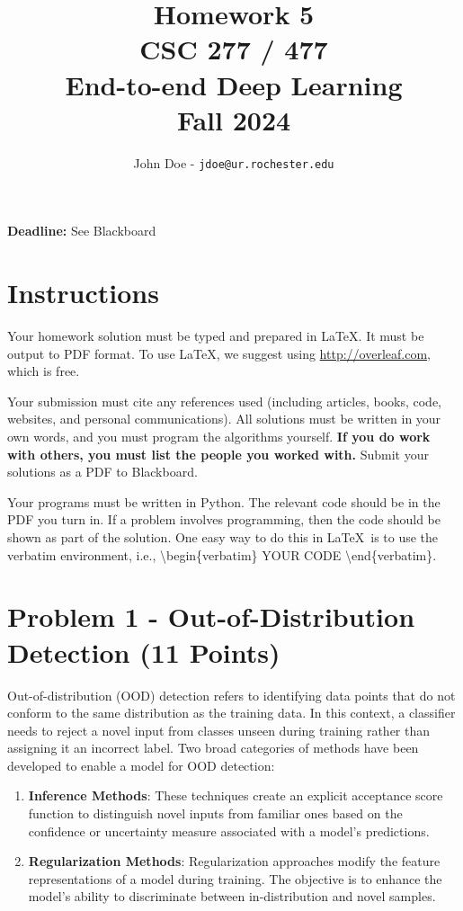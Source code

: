 \documentclass[11pt, oneside]{article}   	%
\title{Homework 5 \\ CSC 277 / 477 \\ End-to-end Deep Learning \\ Fall 2024}
\author{John Doe - \texttt{jdoe@ur.rochester.edu}}
\date{}
\begin{document}
\maketitle

\begin{center}
    \textbf{Deadline:} See Blackboard    
\end{center}


\section*{Instructions}

Your homework solution must be typed and prepared in \LaTeX. It must be output to PDF format. To use \LaTeX, we suggest using \url{http://overleaf.com}, which is free.

Your submission must cite any references used (including articles, books, code, websites, and personal communications).  All solutions must be written in your own words, and you must program the algorithms yourself. \textbf{If you do work with others, you must list the people you worked with.} Submit your solutions as a PDF to Blackboard. 


Your programs must be written in Python. The relevant code should be in the PDF you turn in. If a problem involves programming, then the code should be shown as part of the solution. One easy way to do this in \LaTeX \, is to use the verbatim environment, i.e., \textbackslash begin\{verbatim\} YOUR CODE \textbackslash end\{verbatim\}.




\clearpage


\section*{Problem 1 - Out-of-Distribution Detection (11 Points)}
Out-of-distribution (OOD) detection refers to identifying data points that do not conform to the same distribution as the training data. In this context, a classifier needs to reject a novel input from classes unseen during training rather than assigning it an incorrect label. Two broad categories of methods have been developed to enable a model for OOD detection:
\begin{enumerate}
    \item \textbf{Inference Methods}: These techniques create an explicit acceptance score function to distinguish novel inputs from familiar ones based on the confidence or uncertainty measure associated with a model's predictions.
    \item \textbf{Regularization Methods}: Regularization approaches modify the feature representations of a model during training. The objective is to enhance the model's ability to discriminate between in-distribution and novel samples.
\end{enumerate}
\end{document}
